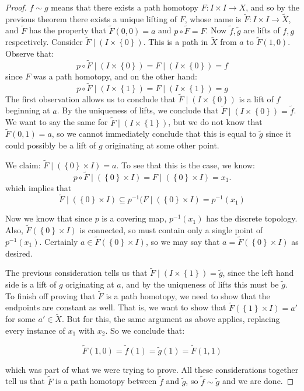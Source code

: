 \begin{proof}
	$f\sim g$ means that there exists a path homotopy $F\colon I\times I\to X$, and so by the previous theorem there exists a unique lifting of $F$, whose name is $\widetilde{F}\colon I\times I\to \widetilde{X}$, and $\widetilde{F}$ has the property that $\widetilde{F}(0,0)=a$ and $p\circ \widetilde{F}=F$. Now $\widetilde{f}, \widetilde{g}$ are lifts of $f,g$ respectively. Consider $\widetilde{F}\mid (I\times \left\{0\right\})$. This is a path in $\widetilde{X}$ from $a$ to $\widetilde{F}(1,0)$. Observe that:
	\[p\circ \widetilde{F}\mid (I\times \left\{0\right\})=F\mid (I\times \left\{0\right\})=f \]
	since $F$ was a path homotopy, and on the other hand:
	\[p\circ \widetilde{F}\mid (I\times \left\{1\right\})=F\mid (I\times \left\{1\right\})=g\]
	The first observation allows us to conclude that $\widetilde{F}\mid (I\times \left\{0\right\})$ is a lift of $f$ beginning at $a$. By the uniqueness of lifts, we conclude that $\widetilde{F}\mid (I\times \left\{0\right\})=\widetilde{f}$. We want to say the same for $\widetilde{F}\mid (I\times \left\{1\right\})$, but we do not know that $\widetilde{F}(0,1)=a$, so we cannot immediately conclude that this is equal to $\widetilde{g}$ since it could possibly be a lift of $g$ originating at some other point.
	
	We claim: $\widetilde{F}\mid (\left\{0\right\} \times I)=a$. To see that this is the case, we know:
	\[p\circ \widetilde{F}\mid (\left\{0\right\} \times I)=F\mid(\left\{0\right\} \times I)=x_1.\]
	which implies that
	\[\widetilde{F}\mid (\left\{0\right\} \times I)\subseteq p^{-1}(F\mid (\left\{0\right\} \times I)=p^{-1}(x_1)\]
	
	Now we know that since $p$ is a covering map, $p^{-1}(x_1)$ has the discrete topology. Also, $\widetilde{F} (\left\{0\right\} \times I)$ is connected, so must contain only a single point of $p^{-1}(x_1)$. Certainly $a\in \widetilde{F}(\left\{0\right\} \times I)$, so we may say that $a=\widetilde{F}(\left\{0\right\} \times I)$ as desired.
	
	The previous consideration tells us that $\widetilde{F}\mid (I\times \left\{1\right\})=\widetilde{g}$, since the left hand side is a lift of $g$ originating at $a$, and by the uniqueness of lifts this must be $\widetilde{g}$. To finish off proving that $\widetilde{F}$ is a path homotopy, we need to show that the endpoints are constant as well. That is, we want to show that $\widetilde{F}(\left\{1\right\} \times I)=a'$ for some $a'\in \widetilde{X}$. But for this, the same argument as above applies, replacing every instance of $x_1$ with $x_2$. So we conclude that: 
	
	\[\widetilde{F}(1,0)=\widetilde{f}(1)=\widetilde{g}(1)=\widetilde{F}(1,1)\]
	
	which was part of what we were trying to prove. All these considerations together tell us that $\widetilde{F}$ is a path homotopy between $\widetilde f$ and $\widetilde{g}$, so $\widetilde{f}\sim \widetilde{g}$ and we are done. 
\end{proof}

